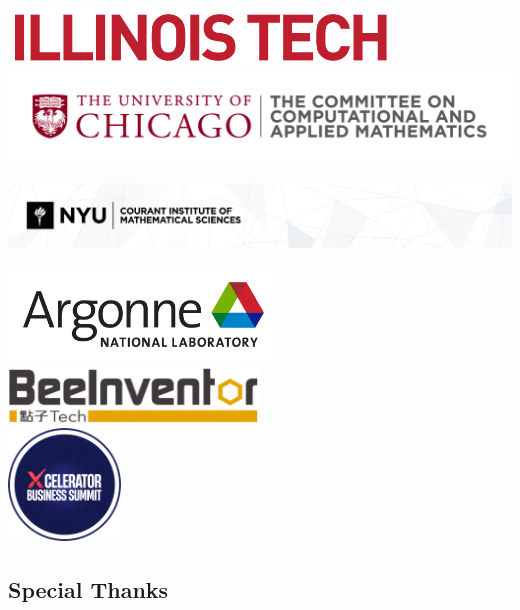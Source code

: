 \begin{center}
\includegraphics[height=1.5cm]{Photos/illinois_tech_logo_full.png} \\[1em]
\includegraphics[height=2.5cm]{Photos/uchicago_cam_logo.png} \\
\includegraphics[height=2.5cm]{Photos/nyu_courant_logo.png} \\
\includegraphics[height=2.5cm]{Photos/argonne_logo.png} \\[1em]
\includegraphics[height=1.5cm]{Photos/beeinventor_logo.png} \\[1em]
\includegraphics[height=3cm]{Photos/xcelerator_logo.png}

\end{center}


\subsection{Special Thanks}


